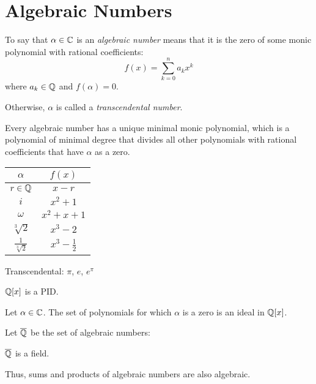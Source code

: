 \documentclass[letterpaper,12pt,fleqn]{article}
\renewcommand{\a}{\alpha}
\newcommand{\w}{\omega}
\begin{document}
\section*{Algebraic Numbers}

\begin{definition}
  To say that $\a\in\C$ is an \emph{algebraic number} means that it is the
  zero of some monic polynomial with rational coefficients:
  \[f(x)=\sum_{k=0}^na_kx^k\]
  where $a_k\in\mathbb{Q}$ and $f(\a)=0$.

  Otherwise, $\a$ is called a \emph{transcendental number}.
\end{definition}

\begin{theorem}
  Every algebraic number has a unique minimal monic polynomial, which is a
  polynomial of minimal degree that divides all other polynomials with
  rational coefficients that have $\a$ as a zero.
\end{theorem}

\begin{example}
  \begin{tabular}{c|c}
    $\a$ & $f(x)$ \\
    \hline
    $r\in\mathbb{Q}$ & $x-r$ \\
    $i$ & $x^2+1$ \\
    $\w$ & $x^2+x+1$ \\
    $\sqrt[3]{2}$ & $x^3-2$ \\
    $\frac{1}{\sqrt[3]{2}}$ & $x^3-\frac{1}{2}$ \\
  \end{tabular}

  Transcendental: $\pi$, $e$, $e^{\pi}$
\end{example}

\begin{theorem}
  $\mathbb{Q}[x]$ is a PID.
\end{theorem}

\begin{theorem}
  Let $\a\in\C$. The set of polynomials for which $\a$ is a zero is an ideal in
  $\mathbb{Q}[x]$.
\end{theorem}

\begin{theorem}
  Let $\overline{\mathbb{Q}}$ be the set of algebraic numbers:

  $\overline{\mathbb{Q}}$ is a field.
\end{theorem}

Thus, sums and products of algebraic numbers are also algebraic.
\end{document}
